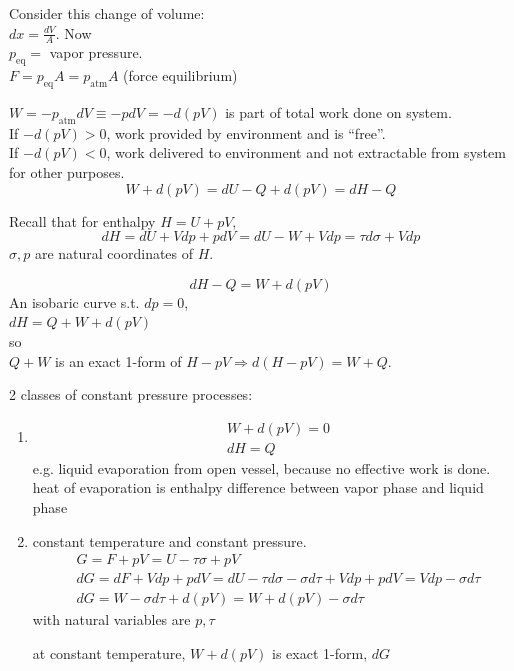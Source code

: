 Consider this change of volume: \\
$dx = \frac{dV}{A}$.  Now \\
$p_{\text{eq}} = $ vapor pressure.  \\

$F = p_{\text{eq}}A = p_{\text{atm}}A$ (force equilibrium)


$W = -p_{\text{atm}}dV \equiv - pdV = -d(pV)$ is part of total work done on system.  \\

If $-d(pV) >0$, work provided by environment and is ``free''.  \\
If $-d(pV)<0$, work delivered to environment and not extractable from system for other purposes.  \\
\[
W + d(pV) = dU- Q + d(pV) = dH-Q
\]

Recall that for enthalpy $H = U+pV$, 
\[
dH = dU + Vdp + pdV = dU - W + Vdp = \tau d\sigma + Vdp 
\]
$\sigma, p$ are natural coordinates of $H$.  

\[
dH - Q = W + d(pV)
\]
An isobaric curve s.t. $dp=0$, \\
$dH = Q + W + d(pV)$ \\
so \\
$Q+W$ is an exact 1-form of $H-pV \Longrightarrow d(H-pV) = W+Q$.  

2 classes of constant pressure processes:
\begin{enumerate}
\item[(a)] \[
\begin{aligned} 
  & W + d(pV) = 0 \\
  & dH = Q \end{aligned}
\]
e.g. liquid evaporation from open vessel, because no effective work is done.  \\
heat of evaporation is enthalpy difference between vapor phase and liquid phase
\item[(b)] constant temperature and constant pressure.  
\[
\begin{aligned}
&  G = F + pV = U-\tau \sigma + pV \\ 
& dG = dF + V dp + p dV = dU - \tau d\sigma - \sigma d\tau + V dp  + p dV = V dp- \sigma d\tau \\
&  dG = W - \sigma d\tau + d(pV) = W + d(pV) - \sigma d\tau
\end{aligned}
\]
with natural variables are $p,\tau$ 

at constant temperature, $W + d(pV)$ is exact 1-form, $dG$  
\end{enumerate}

